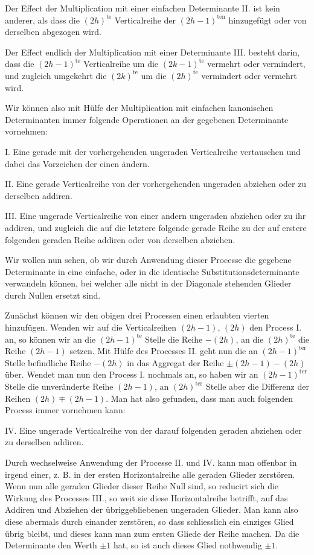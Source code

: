 \documentclass[10pt]{article}
\begin{document}
Der Effect der Multiplication mit einer einfachen Determinante II. ist kein anderer, als dass die \((2h)^{\mathrm{te}}\) Verticalreihe der \((2h-1)^{\mathrm{ten}}\) hinzugefügt oder von derselben abgezogen wird.

Der Effect endlich der Multiplication mit einer Determinante III. besteht darin, dass die \((2h-1)^{\mathrm{te}}\) Verticalreihe um die \((2k-1)^{\mathrm{te}}\) vermehrt oder vermindert, und zugleich umgekehrt die \((2k)^{\mathrm{te}}\) um die \((2h)^{\mathrm{te}}\) vermindert oder vermehrt wird.

Wir können also mit Hülfe der Multiplication mit einfachen kanonischen Determinanten immer folgende Operationen an der gegebenen Determinante vornehmen:

I. Eine gerade mit der vorhergehenden ungeraden Verticalreihe vertauschen und dabei das Vorzeichen der einen ändern.

II. Eine gerade Verticalreihe von der vorhergehenden ungeraden abziehen oder zu derselben addiren.

III. Eine ungerade Verticalreihe von einer andern ungeraden abziehen oder zu ihr addiren, und zugleich die auf die letztere folgende gerade Reihe zu der auf erstere folgenden geraden Reihe addiren oder von derselben abziehen.

Wir wollen nun sehen, ob wir durch Anwendung dieser Processe die gegebene Determinante in eine einfache, oder in die identische Substitutionsdeterminante verwandeln können, bei welcher alle nicht in der Diagonale stehenden Glieder durch Nullen ersetzt sind.

Zunächst können wir den obigen drei Processen einen erlaubten vierten hinzufügen. Wenden wir auf die Verticalreihen \((2h-1)\), \((2h)\) den Process I. an, so können wir an die \((2h-1)^{\mathrm{te}}\) Stelle die Reihe \(-(2h)\), an die \((2h)^{\mathrm{te}}\) die Reihe \((2h-1)\) setzen. Mit Hülfe des Processes II. geht nun die an \((2h-1)^{\mathrm{ter}}\) Stelle befindliche Reihe \(-(2h)\) in das Aggregat der Reihe \(\pm(2h-1)-(2h)\) über. Wendet man nun den Process I. nochmals an, so haben wir an \((2h-1)^{\mathrm{ter}}\) Stelle die unveränderte Reihe \((2h-1)\), an \((2h)^{\mathrm{ter}}\) Stelle aber die Differenz der Reihen \((2h)\mp(2h-1)\). Man hat also gefunden, dass man auch folgenden Process immer vornehmen kann:

IV. Eine ungerade Verticalreihe von der darauf folgenden geraden abziehen oder zu derselben addiren.

Durch wechselweise Anwendung der Processe II. und IV. kann man offenbar in irgend einer, z. B. in der ersten Horizontalreihe alle geraden Glieder zerstören. Wenn nun alle geraden Glieder dieser Reihe Null sind, so reducirt sich die Wirkung des Processes III., so weit sie diese Horizontalreihe betrifft, auf das Addiren und Abziehen der übriggebliebenen ungeraden Glieder. Man kann also diese abermals durch einander zerstören, so dass schliesslich ein einziges Glied übrig bleibt, und dieses kann man zum ersten Gliede der Reihe machen. Da die Determinante den Werth \(\pm1\) hat, so ist auch dieses Glied nothwendig \(\pm1\).
\end{document}
